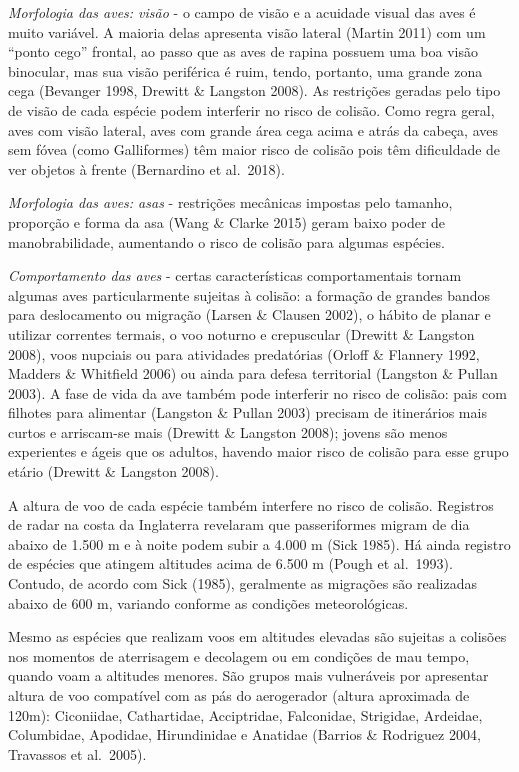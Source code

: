 \documentclass[
  oneside]{scrbook}
\begin{document}
\emph{Morfologia das aves: visão} - o campo de visão e a acuidade visual das aves é muito variável. A maioria delas apresenta visão lateral (Martin 2011) com um ``ponto cego'' frontal, ao passo que as aves de rapina possuem uma boa visão binocular, mas sua visão periférica é ruim, tendo, portanto, uma grande zona cega (Bevanger 1998, Drewitt \& Langston 2008). As restrições geradas pelo tipo de visão de cada espécie podem interferir no risco de colisão. Como regra geral, aves com visão lateral, aves com grande área cega acima e atrás da cabeça, aves sem fóvea (como Galliformes) têm maior risco de colisão pois têm dificuldade de ver objetos à frente (Bernardino et al.~2018).

\emph{Morfologia das aves: asas} - restrições mecânicas impostas pelo tamanho, proporção e forma da asa (Wang \& Clarke 2015) geram baixo poder de manobrabilidade, aumentando o risco de colisão para algumas espécies.

\emph{Comportamento das aves} - certas características comportamentais tornam algumas aves particularmente sujeitas à colisão: a formação de grandes bandos para deslocamento ou migração (Larsen \& Clausen 2002), o hábito de planar e utilizar correntes termais, o voo noturno e crepuscular (Drewitt \& Langston 2008), voos nupciais ou para atividades predatórias (Orloff \& Flannery 1992, Madders \& Whitfield 2006) ou ainda para defesa territorial (Langston \& Pullan 2003). A fase de vida da ave também pode interferir no risco de colisão: pais com filhotes para alimentar (Langston \& Pullan 2003) precisam de itinerários mais curtos e arriscam-se mais (Drewitt \& Langston 2008); jovens são menos experientes e ágeis que os adultos, havendo maior risco de colisão para esse grupo etário (Drewitt \& Langston 2008).

A altura de voo de cada espécie também interfere no risco de colisão. Registros de radar na costa da Inglaterra revelaram que passeriformes migram de dia abaixo de 1.500 m e à noite podem subir a 4.000 m (Sick 1985). Há ainda registro de espécies que atingem altitudes acima de 6.500 m (Pough et al.~1993). Contudo, de acordo com Sick (1985), geralmente as migrações são realizadas abaixo de 600 m, variando conforme as condições meteorológicas.

Mesmo as espécies que realizam voos em altitudes elevadas são sujeitas a colisões nos momentos de aterrisagem e decolagem ou em condições de mau tempo, quando voam a altitudes menores. São grupos mais vulneráveis por apresentar altura de voo compatível com as pás do aerogerador (altura aproximada de 120m): Ciconiidae, Cathartidae, Acciptridae, Falconidae, Strigidae, Ardeidae, Columbidae, Apodidae, Hirundinidae e Anatidae (Barrios \& Rodriguez 2004, Travassos et al.~2005).
\end{document}

